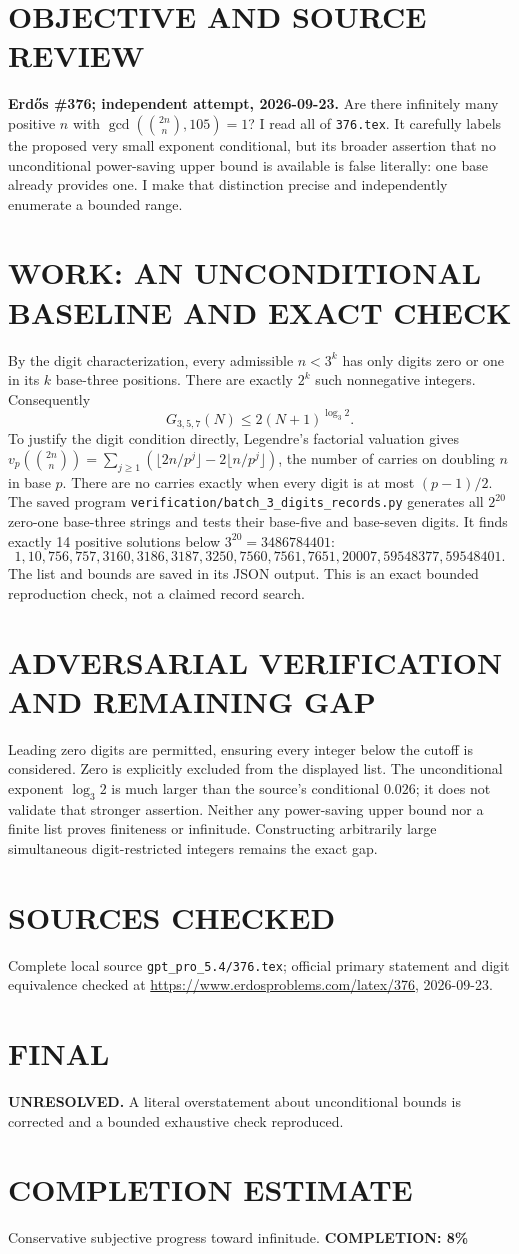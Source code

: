 \section{OBJECTIVE AND SOURCE REVIEW}
\textbf{Erd\H{o}s \#376; independent attempt, 2026-09-23.}
Are there infinitely many positive $n$ with $\gcd(\binom{2n}{n},105)=1$? I read all of \texttt{376.tex}. It carefully labels the proposed very small exponent conditional, but its broader assertion that no unconditional power-saving upper bound is available is false literally: one base already provides one. I make that distinction precise and independently enumerate a bounded range.
\section{WORK: AN UNCONDITIONAL BASELINE AND EXACT CHECK}
By the digit characterization, every admissible $n<3^k$ has only digits zero or one in its $k$ base-three positions. There are exactly $2^k$ such nonnegative integers. Consequently
\[
G_{3,5,7}(N)\le2(N+1)^{\log_3 2}.
\]
To justify the digit condition directly, Legendre's factorial valuation gives
$v_p(\binom{2n}{n})=\sum_{j\ge1}(\lfloor2n/p^j\rfloor-2\lfloor n/p^j\rfloor)$, the number of carries on doubling $n$ in base $p$. There are no carries exactly when every digit is at most $(p-1)/2$.
The saved program \texttt{verification/batch\_3\_digits\_records.py} generates all $2^{20}$ zero-one base-three strings and tests their base-five and base-seven digits. It finds exactly 14 positive solutions below $3^{20}=3486784401$:
\[
1,10,756,757,3160,3186,3187,3250,7560,7561,7651,
20007,59548377,59548401.
\]
The list and bounds are saved in its JSON output. This is an exact bounded reproduction check, not a claimed record search.
\section{ADVERSARIAL VERIFICATION AND REMAINING GAP}
Leading zero digits are permitted, ensuring every integer below the cutoff is considered. Zero is explicitly excluded from the displayed list. The unconditional exponent $\log_3 2$ is much larger than the source's conditional $0.026$; it does not validate that stronger assertion. Neither any power-saving upper bound nor a finite list proves finiteness or infinitude. Constructing arbitrarily large simultaneous digit-restricted integers remains the exact gap.
\section{SOURCES CHECKED}
Complete local source \texttt{gpt\_pro\_5.4/376.tex}; official primary statement and digit equivalence checked at \url{https://www.erdosproblems.com/latex/376}, 2026-09-23.
\section{FINAL}
\textbf{UNRESOLVED.} A literal overstatement about unconditional bounds is corrected and a bounded exhaustive check reproduced.
\section{COMPLETION ESTIMATE}
Conservative subjective progress toward infinitude.
\textbf{COMPLETION: 8\%}
